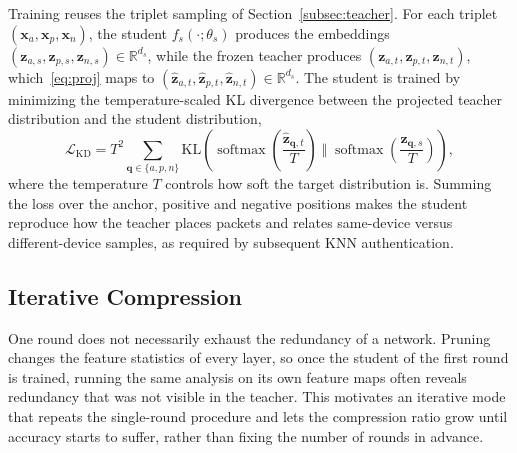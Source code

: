 \documentclass[journal,comsoc]{IEEEtran}
\begin{document}
Training reuses the triplet sampling of Section~\ref{subsec:teacher}.
For each triplet $(\mathbf{x}_a, \mathbf{x}_p, \mathbf{x}_n)$, the student $f_s(\cdot;\theta_s)$ produces the embeddings $(\mathbf{z}_{a,s}, \mathbf{z}_{p,s}, \mathbf{z}_{n,s}) \in \mathbb{R}^{d_s}$, while the frozen teacher produces $(\mathbf{z}_{a,t}, \mathbf{z}_{p,t}, \mathbf{z}_{n,t})$, which~\eqref{eq:proj} maps to $(\hat{\mathbf{z}}_{a,t}, \hat{\mathbf{z}}_{p,t}, \hat{\mathbf{z}}_{n,t}) \in \mathbb{R}^{d_s}$.
The student is trained by minimizing the temperature-scaled KL divergence between the projected teacher distribution and the student distribution,
\begin{equation}
\label{eq:kd}
\mathcal{L}_{\text{KD}} =
T^2 \sum_{\mathbf{q} \in \{a,p,n\}}
\mathrm{KL}\!\left(
\operatorname{softmax}\!\left(\frac{\hat{\mathbf{z}}_{\mathbf{q},t}}{T}\right)
\;\Big\Vert\;
\operatorname{softmax}\!\left(\frac{\mathbf{z}_{\mathbf{q},s}}{T}\right)
\right),
\end{equation}
where the temperature $T$ controls how soft the target distribution is.
Summing the loss over the anchor, positive and negative positions makes the student reproduce how the teacher places packets and relates same-device versus different-device samples, as required by subsequent KNN authentication.

\subsection{Iterative Compression}
\label{subsec:iterative}

One round does not necessarily exhaust the redundancy of a network.
Pruning changes the feature statistics of every layer, so once the student of the first round is trained, running the same analysis on its own feature maps often reveals redundancy that was not visible in the teacher.
This motivates an iterative mode that repeats the single-round procedure and lets the compression ratio grow until accuracy starts to suffer, rather than fixing the number of rounds in advance.
\end{document}
